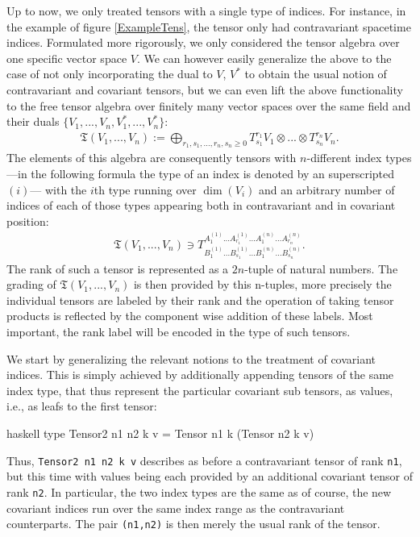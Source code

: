 Up to now, we only treated tensors with a single type of indices. For instance, in the example of figure \ref{ExampleTens}, the tensor only had contravariant spacetime indices.
Formulated more rigorously, we only considered the tensor algebra over one specific vector space $V$.
We can however easily generalize the above to the case of not only incorporating the dual to $V$, $V^{\ast}$ to obtain the usual notion of contravariant and covariant tensors, but we can even lift the above functionality to the free tensor algebra over finitely many vector spaces over the same field and their duals $\{V_1,...,V_n,V_1^{\ast},...,V_n^{\ast}\}$:
\begin{align}
    \mathfrak{T}(V_1,...,V_n) := \bigoplus_{r_1,s_1,...,r_n,s_n \geq 0}T^{r_1}_{s_1}V_1 \otimes ... \otimes T^{r_n}_{s_n}V_n.
\end{align}
The elements of this algebra are consequently tensors with $n$-different index types ---in the following formula the type of an index is denoted by an superscripted $(i)$--- with the $i$th type running over $\operatorname{dim}(V_i)$ and an arbitrary number of indices of each of those types appearing both in contravariant and in covariant position:
\begin{align}
    \mathfrak{T}(V_1,...,V_n) \ni T^{A^{(1)}_1 ... A^{(1)}_{r_1} ... A^{(n)}_1 ... A^{(n)}_{r_n}}
    _{B^{(1)}_1 ... B^{(1)}_{s_1} ... B^{(n)}_1 ... B^{(n)}_{s_n}}.
\end{align}
The rank of such a tensor is represented as a $2n$-tuple of natural numbers. The grading of $\mathfrak{T}(V_1,...,V_n)$ is then provided by this n-tuples, more precisely the individual tensors are labeled by their rank and the operation of taking tensor products is reflected by the component wise addition of these labels. Most important, the rank label will be encoded in the type of such tensors.

We start by generalizing the relevant notions to the treatment of covariant indices.
This is simply achieved by additionally appending tensors of the same index type, that thus represent the particular covariant sub tensors, as values, i.e., as leafs
to the first tensor:
\begin{center}
\begin{cminted}{haskell}
type Tensor2 n1 n2 k v = Tensor n1 k (Tensor n2 k v)
\end{cminted}
\end{center}
Thus, \texttt{Tensor2 n1 n2 k v} describes as before a contravariant tensor of rank \texttt{n1}, but this time with values being each provided by an additional covariant tensor of rank \texttt{n2}. In particular, the two index types are the same as of course, the new covariant indices run over the same index range as the contravariant counterparts. The pair \texttt{(n1,n2)} is then merely the usual rank of the tensor.

